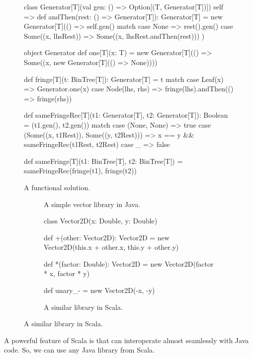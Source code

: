 \documentclass{book}
\begin{document}
\begin{figure}
\begin{scalacode}
class Generator[T](val gen: () => Option[(T, Generator[T])]) { self =>
  def andThen(rest: () => Generator[T]): Generator[T] = new Generator[T](() => self.gen() match {
      case None => rest().gen()
      case Some((x, lhsRest)) => Some((x, lhsRest.andThen(rest)))
  })
}

object Generator {
  def one[T](x: T) = new Generator[T](() => Some((x, new Generator[T](() => None))))
}

def fringe[T](t: BinTree[T]): Generator[T] = t match {
  case Leaf(x) => Generator.one(x)
  case Node(lhs, rhs) => fringe(lhs).andThen(() => fringe(rhs))
}

def sameFringeRec[T](t1: Generator[T], t2: Generator[T]): Boolean = (t1.gen(), t2.gen()) match {
  case (None, None) => true
  case (Some((x, t1Rest)), Some((y, t2Rest))) => x == y && sameFringeRec(t1Rest, t2Rest)
  case _ => false
}

def sameFringe[T](t1: BinTree[T], t2: BinTree[T]) = sameFringeRec(fringe(t1), fringe(t2))
\end{scalacode}
\caption{A functional solution.}
\label{sameFringeFun}
\end{figure}

\newlecture
\begin{figure}
\begin{subfigure}{.45\textwidth}
\caption{A simple vector library in Java.}
\label{vector2d}
\end{subfigure}
\quad\vrule\quad
\begin{subfigure}{.45\textwidth}
\begin{scalacode}
class Vector2D(x: Double, y: Double) {
  def +(other: Vector2D): Vector2D = {
    new Vector2D(this.x + other.x, 
                 this.y + other.y)
  }

  def *(factor: Double): Vector2D = {
    new Vector2D(factor * x, 
                 factor * y)
  }

  def unary_- = new Vector2D(-x, -y)
}
\end{scalacode}
\caption{A similar library in Scala.}
\label{vector2dscala}
\end{subfigure}
\end{figure}


A powerful feature of Scala is that can interoperate almost seamlessly with
Java code. So, we can use any Java library from Scala.
\end{document}
